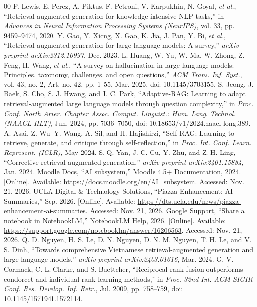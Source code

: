 \documentclass{IEEEtran}
\begin{document}
\balance
\begin{thebibliography}{00}
\setlength{\itemsep}{0.5pt}
\setlength{\parskip}{0pt}
 P. Lewis, E. Perez, A. Piktus, F. Petroni, V. Karpukhin, N. Goyal, \textit{et al.}, ``Retrieval-augmented generation for knowledge-intensive NLP tasks,'' in \textit{Advances in Neural Information Processing Systems (NeurIPS)}, vol. 33, pp. 9459--9474, 2020.
 Y. Gao, Y. Xiong, X. Gao, K. Jia, J. Pan, Y. Bi, \textit{et al.}, ``Retrieval-augmented generation for large language models: A survey,'' \textit{arXiv preprint arXiv:2312.10997}, Dec. 2023.
 L. Huang, W. Yu, W. Ma, W. Zhong, Z. Feng, H. Wang, \textit{et al.}, ``A survey on hallucination in large language models: Principles, taxonomy, challenges, and open questions,'' \textit{ACM Trans. Inf. Syst.}, vol. 43, no. 2, Art. no. 42, pp. 1--55, Mar. 2025, doi: 10.1145/3703155.
 S. Jeong, J. Baek, S. Cho, S. J. Hwang, and J. C. Park, ``Adaptive-RAG: Learning to adapt retrieval-augmented large language models through question complexity,'' in \textit{Proc. Conf. North Amer. Chapter Assoc. Comput. Linguist.: Hum. Lang. Technol. (NAACL-HLT)}, Jun. 2024, pp. 7036--7050, doi: 10.18653/v1/2024.naacl-long.389.
 A. Asai, Z. Wu, Y. Wang, A. Sil, and H. Hajishirzi, ``Self-RAG: Learning to retrieve, generate, and critique through self-reflection,'' in \textit{Proc. Int. Conf. Learn. Represent. (ICLR)}, May 2024.
 S.-Q. Yan, J.-C. Gu, Y. Zhu, and Z.-H. Ling, ``Corrective retrieval augmented generation,'' \textit{arXiv preprint arXiv:2401.15884}, Jan. 2024.
 Moodle Docs, ``AI subsystem,'' Moodle 4.5+ Documentation, 2024. [Online]. Available: \url{https://docs.moodle.org/en/AI_subsystem}. Accessed: Nov. 21, 2026.
 UCLA Digital \& Technology Solutions, ``Piazza Enhancement: AI Summaries,'' Sep. 2026. [Online]. Available: \url{https://dts.ucla.edu/news/piazza-enhancement-ai-summaries}. Accessed: Nov. 21, 2026.
 Google Support, ``Share a notebook in NotebookLM,'' NotebookLM Help, 2026. [Online]. Available: \url{https://support.google.com/notebooklm/answer/16206563}. Accessed: Nov. 21, 2026.
 Q. D. Nguyen, H. S. Le, D. N. Nguyen, D. N. M. Nguyen, T. H. Le, and V. S. Dinh, ``Towards comprehensive Vietnamese retrieval-augmented generation and large language models,'' \textit{arXiv preprint arXiv:2403.01616}, Mar. 2024.
 G. V. Cormack, C. L. Clarke, and S. Buettcher, ``Reciprocal rank fusion outperforms condorcet and individual rank learning methods,'' in \textit{Proc. 32nd Int. ACM SIGIR Conf. Res. Develop. Inf. Retr.}, Jul. 2009, pp. 758--759, doi: 10.1145/1571941.1572114.

\end{thebibliography}
\end{document}
